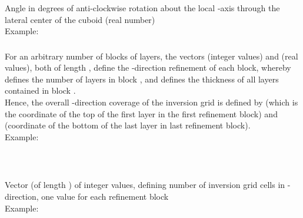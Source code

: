 \subsubsection{}
Angle in degrees of anti-clockwise rotation about the local -axis through the 
lateral center of the cuboid (real number)\\
Example:\\
\subsubsection{}
For an arbitrary number of  blocks of layers,
the vectors  (integer values) and  (real values), 
both of length , define the -direction refinement of each block,
whereby  defines the number of layers in block , and 
 defines the thickness of all layers contained in block .\\
Hence, the overall -direction coverage of the inversion grid is defined by 
 (which is the coordinate of the top of the first layer in the first refinement block)
and  (coordinate of the bottom of the last layer in
last refinement block).\\
Example:\\
\\
\\
\subsubsection{}
Vector (of length ) of integer values, defining number of 
inversion grid cells in -direction, one value for each refinement block\\
Example:\\
